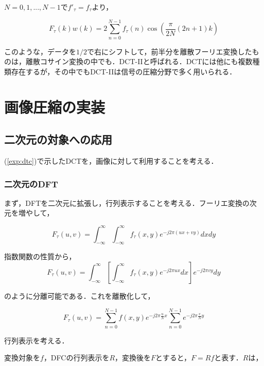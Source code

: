 \documentclass[uplatex,dvipdfmx,ja=standard]{bxjsarticle}
\begin{document}
$N= 0,1,...,N-1$で$f'_{\tau} = f_{\tau}$より，

\begin{equation}
    \label{exp:dtc}
    F_{\tau}(k) w(k) = 2 \sum_{n=0}^{N-1} f_{\tau}(n) \cos{\left( \frac{\pi}{2N} (2n + 1)k \right)}
\end{equation}

このような，データを$1/2$で右にシフトして，前半分を離散フーリエ変換したものは，離散コサイン変換の中でも．DCT-IIと呼ばれる．DCTには他にも複数種類存在するが，その中でもDCT-IIは信号の圧縮分野で多く用いられる．

\section{画像圧縮の実装}

\subsection{二次元の対象への応用}

(\ref{exp:dtc})で示したDCTを，画像に対して利用することを考える．

\subsubsection{二次元のDFT}

まず，DFTを二次元に拡張し，行列表示することを考える．フーリエ変換の次元を増やして，

\begin{equation}
    F_{\tau}(u,v) = \int_{-\infty}^{\infty} \int_{-\infty}^{\infty} f_{\tau}(x,y) e^{-j 2\pi (ux + vy)} dxdy
\end{equation}

指数関数の性質から，
\begin{equation}
    F_{\tau}(u,v) = \int_{-\infty}^{\infty} \left[ \int_{-\infty}^{\infty} f_{\tau}(x,y) e^{-j 2\pi ux} dx \right] e^{-j 2\pi vy} dy
\end{equation}

のように分離可能である．これを離散化して，

\begin{equation}
    F_{\tau}(u,v) = \sum_{n=0}^{N-1} f(x,y) e^{-j 2\pi \frac{u}{N}x} \sum_{n=0}^{N-1} e^{-j 2\pi \frac{v}{N}y}
\end{equation}

行列表示を考える．

変換対象を$f$，DFCの行列表示を$R$，変換後を$F$とすると，$F = Rf$と表す．$R$は，
\end{document}
